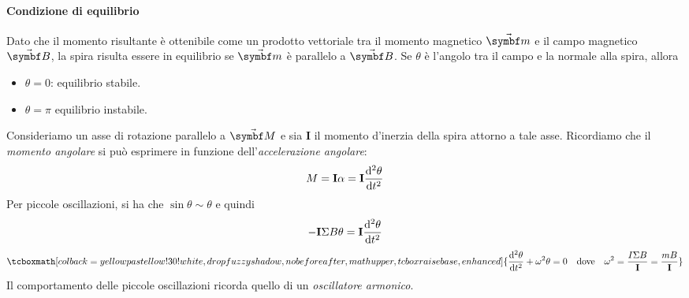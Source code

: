 \paragraph{Condizione di equilibrio}
Dato che il momento risultante è ottenibile come un prodotto vettoriale tra il momento magnetico $\vba{m}$ e il campo magnetico $\vba{B}$, la spira risulta essere in equilibrio se $\vba{m}$ è parallelo a $\vba{B}$. Se $\theta$ è l'angolo tra il campo e la normale alla spira, allora
\begin{itemize}
	\item $\theta = 0$: equilibrio stabile.
	\item $\theta = \pi$ equilibrio instabile.
\end{itemize}
Consideriamo un asse di rotazione parallelo a $\vba{M}$ e sia $\mathbf{I}$ il momento d'inerzia della spira attorno a tale asse. Ricordiamo che il \textit{momento angolare} si può esprimere in funzione dell'\textit{accelerazione angolare}:
\begin{equation}
	M=\mathbf{I}\alpha=\mathbf{I}\dv[2]{\theta}{t}
\end{equation}
Per piccole oscillazioni, si ha che $\sin\theta\sim\theta$ e quindi
\begin{equation*}
	-\mathbf{I}\Sigma B\theta=\mathbf{I}\dv[2]{\theta}{t}
\end{equation*}
\begin{equation}
	\tcboxmath[colback=yellowpastellow!30!white,drop fuzzy shadow, nobeforeafter, math upper, tcbox raise base, enhanced]{\dv[2]{\theta}{t}+\omega^2\theta=0\quad\text{dove}\quad\omega^2=\frac{I\Sigma B}{\mathbf{I}}=\frac{m B}{\mathbf{I}}}
\end{equation}
Il comportamento delle piccole oscillazioni ricorda quello di un \textit{oscillatore armonico}.
